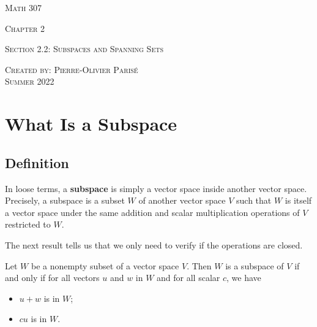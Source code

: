 \documentclass[12pt,a4paper]{article}
\begin{document}
\thispagestyle{empty}

\begin{center}
\vspace*{2.5cm}

{\Huge \textsc{Math 307}}

\vspace*{2cm}

{\LARGE \textsc{Chapter 2}} 

\vspace*{0.75cm}

\noindent\textsc{Section 2.2: Subspaces and Spanning Sets}

\vspace*{0.75cm}

\tableofcontents

\vfill

\noindent \textsc{Created by: Pierre-Olivier Paris{\'e}} \\
\textsc{Summer 2022}
\end{center}

\newpage

\section{What Is a Subspace}

	\subsection{Definition}

	In loose terms, a \textbf{subspace} is simply a vector space inside another vector space. Precisely, a subspace is a subset $W$ of another vector space $V$ such that $W$ is itself a vector space under the same addition and scalar multiplication operations of $V$ restricted to $W$.
	
	The next result tells us that we only need to verify if the operations are closed.
	
	\vspace*{18pt}
	
	\begin{theorem}
	Let $W$ be a nonempty subset of a vector space $V$. Then $W$ is a subspace of $V$ if and only if for all vectors $u$ and $w$ in $W$ and for all scalar $c$, we have 
		\begin{itemize}
		\item $u + w$ is in $W$;
		\item $c u$ is in $W$.
		\end{itemize}
	\end{theorem}
	
\end{document}
